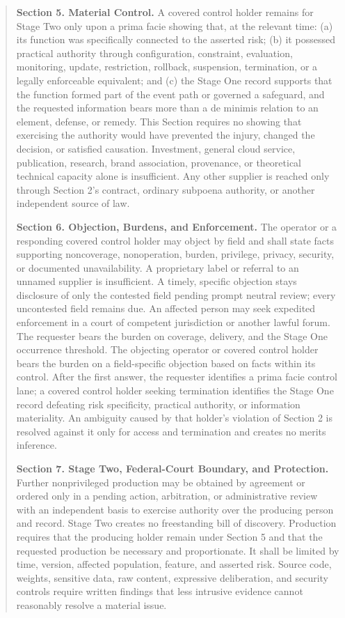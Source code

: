 \begin{quote}
\textbf{Section 5. Material Control.} A covered control holder remains for Stage Two only upon a prima facie showing that, at the relevant time: (a) its function was specifically connected to the asserted risk; (b) it possessed practical authority through configuration, constraint, evaluation, monitoring, update, restriction, rollback, suspension, termination, or a legally enforceable equivalent; and (c) the Stage One record supports that the function formed part of the event path or governed a safeguard, and the requested information bears more than a de minimis relation to an element, defense, or remedy. This Section requires no showing that exercising the authority would have prevented the injury, changed the decision, or satisfied causation. Investment, general cloud service, publication, research, brand association, provenance, or theoretical technical capacity alone is insufficient. Any other supplier is reached only through Section 2's contract, ordinary subpoena authority, or another independent source of law.

\textbf{Section 6. Objection, Burdens, and Enforcement.} The operator or a responding covered control holder may object by field and shall state facts supporting noncoverage, nonoperation, burden, privilege, privacy, security, or documented unavailability. A proprietary label or referral to an unnamed supplier is insufficient. A timely, specific objection stays disclosure of only the contested field pending prompt neutral review; every uncontested field remains due. An affected person may seek expedited enforcement in a court of competent jurisdiction or another lawful forum. The requester bears the burden on coverage, delivery, and the Stage One occurrence threshold. The objecting operator or covered control holder bears the burden on a field-specific objection based on facts within its control. After the first answer, the requester identifies a prima facie control lane; a covered control holder seeking termination identifies the Stage One record defeating risk specificity, practical authority, or information materiality. An ambiguity caused by that holder's violation of Section 2 is resolved against it only for access and termination and creates no merits inference.

\textbf{Section 7. Stage Two, Federal-Court Boundary, and Protection.} Further nonprivileged production may be obtained by agreement or ordered only in a pending action, arbitration, or administrative review with an independent basis to exercise authority over the producing person and record. Stage Two creates no freestanding bill of discovery. Production requires that the producing holder remain under Section 5 and that the requested production be necessary and proportionate. It shall be limited by time, version, affected population, feature, and asserted risk. Source code, weights, sensitive data, raw content, expressive deliberation, and security controls require written findings that less intrusive evidence cannot reasonably resolve a material issue.


\end{quote}
